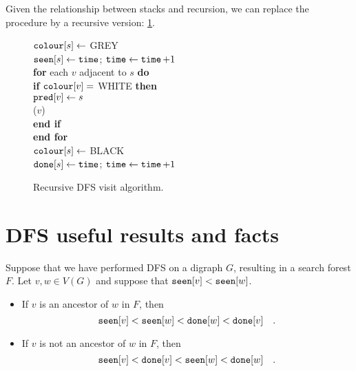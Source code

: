 Given the relationship between stacks and recursion, we can replace the  procedure by
a recursive version: \cref{fig:DFSreccode}.

\begin{figure}[htbp]
\hspace*{1.3in}\begin{minipage}{5in}
{
\> $\colour[s] \gets $ GREY \\
\> $\seen[s] \gets \timeVar$; $\timeVar \gets \timeVar + 1$ \\
\> \textbf{for} each $v$ adjacent to $s$ \textbf{do} \\
\> \> \textbf{if} $\colour[v] = $ WHITE \textbf{then} \\
\> \> \> $\pred[v] \gets s$ \\
\> \> \> ($v$) \\
\> \> \textbf{end if} \\
\> \textbf{end for} \\
\> $\colour[s] \gets $ BLACK \\
\> $\done[s] \gets \timeVar $; $\timeVar \gets \timeVar + 1$ \\
}
\end{minipage}
\caption{Recursive DFS visit algorithm.}
\label{fig:DFSreccode}
\end{figure}

\section{DFS useful results and facts}

%


\begin{Theorem}
\label{thm:DFS-seen-done}
Suppose that we have performed DFS on a digraph $G$, resulting in a 
search forest $F$. Let $v, w \in V(G)$ and suppose that $\seen[v] < \seen[w]$. 

\begin{itemize}
\item
If $v$ is an ancestor of $w$ in $F$, then 
$$\seen[v] < \seen[w] < \done[w] < \done[v] \quad .$$
\item
If $v$ is not an ancestor of $w$ in $F$, then
$$\seen[v] < \done[v]  < \seen[w] < \done[w] \quad .$$
\end{itemize}
\end{Theorem}

